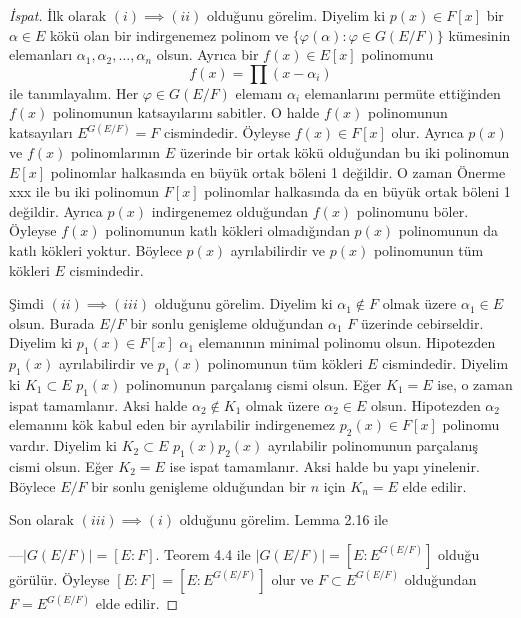 \documentclass[draft]{article}
\theoremstyle{definition}
\theoremstyle{remark}
\newcommand{\envert}[1]{\left\lvert#1\right\rvert}
\let\abs=\envert
\begin{document}
    		\begin{proof}[İspat]
    	        İlk olarak $(i) \implies (ii)$ olduğunu görelim. Diyelim ki $p(x) \in F[x]$ bir $\alpha \in E$ kökü olan bir indirgenemez polinom ve $\{\varphi(\alpha) : \varphi \in G(E/F)\}$ kümesinin elemanları $\alpha_1, \alpha_2, \dots, \alpha_n$ olsun. Ayrıca bir $f(x) \in E[x]$ polinomunu
    	        \begin{equation*}
    	            f(x) = \prod{(x - \alpha_i)}
    	        \end{equation*}
    	        ile tanımlayalım. Her $\varphi \in G(E/F)$ elemanı $\alpha_i$ elemanlarını permüte ettiğinden $f(x)$ polinomunun katsayılarını sabitler. O halde $f(x)$ polinomunun katsayıları $E^{G(E/F)} = F$ cismindedir. Öyleyse $f(x) \in F[x]$ olur. Ayrıca $p(x)$ ve $f(x)$ polinomlarının $E$ üzerinde bir ortak kökü olduğundan bu iki polinomun $E[x]$ polinomlar halkasında en büyük ortak böleni 1 değildir. O zaman Önerme xxx ile bu iki polinomun $F[x]$ polinomlar halkasında da en büyük ortak böleni 1 değildir. Ayrıca $p(x)$ indirgenemez olduğundan $f(x)$ polinomunu böler. Öyleyse $f(x)$ polinomunun katlı kökleri olmadığından $p(x)$ polinomunun da katlı kökleri yoktur. Böylece $p(x)$ ayrılabilirdir ve $p(x)$ polinomunun tüm kökleri $E$ cismindedir.\par
    	        Şimdi $(ii) \implies (iii)$ olduğunu görelim. Diyelim ki $\alpha_1 \notin F$ olmak üzere $\alpha_1 \in E$ olsun. Burada $E/F$ bir sonlu genişleme olduğundan $\alpha_1$ $F$ üzerinde cebirseldir. Diyelim ki $p_1(x) \in F[x]$ $\alpha_1$ elemanının minimal polinomu olsun. Hipotezden $p_1(x)$ ayrılabilirdir ve $p_1(x)$ polinomunun tüm kökleri $E$ cismindedir. Diyelim ki $K_1 \subset E$ $p_1(x)$ polinomunun parçalanış cismi olsun. Eğer $K_1 = E$ ise, o zaman ispat tamamlanır. Aksi halde $\alpha_2 \notin K_1$ olmak üzere $\alpha_2 \in E$ olsun. Hipotezden $\alpha_2$ elemanını kök kabul eden bir ayrılabilir indirgenemez $p_2(x) \in F[x]$ polinomu vardır. Diyelim ki $K_2 \subset E$ $p_1(x)p_2(x)$ ayrılabilir polinomunun parçalanış cismi olsun. Eğer $K_2 = E$ ise ispat tamamlanır. Aksi halde bu yapı yinelenir. Böylece $E/F$ bir sonlu genişleme olduğundan bir $n$ için $K_n = E$ elde edilir.\par
    	        Son olarak $(iii) \implies (i)$ olduğunu görelim. Lemma 2.16 ile 
    	        
    	        
    	        
    	        ---$\abs{G(E/F)} = [E : F]$. Teorem 4.4 ile $\abs{G(E/F)} = [E : E^{G(E/F)}]$ olduğu görülür. Öyleyse $[E : F] = [E : E^{G(E/F)}]$ olur ve $F \subset E^{G(E/F)}$ olduğundan $F = E^{G(E/F)}$ elde edilir.
    	    \end{proof}
    	    
\end{document}

